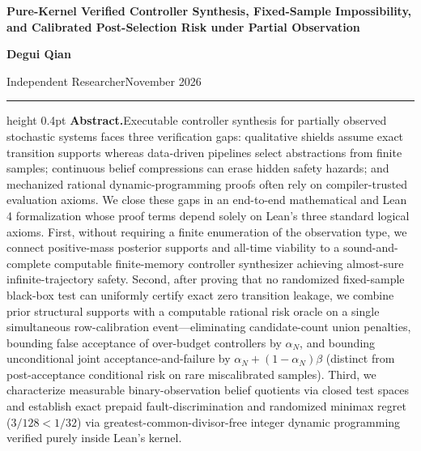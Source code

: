 \documentclass[11pt,a4paper]{article}
\begin{document}
\thispagestyle{plain}
\nolinenumbers
\begin{flushleft}
{\fontsize{17.5}{22}\selectfont\bfseries Pure-Kernel Verified Controller
Synthesis, Fixed-Sample Impossibility, and Calibrated Post-Selection
Risk under Partial Observation\par}
\vspace{9pt}
{\large\bfseries Degui Qian\par}
\vspace{3pt}
{\small Independent Researcher\quad\textperiodcentered\quad November
2026\par}
\end{flushleft}
\vspace{6pt}
\hrule height 0.4pt
\vspace{8pt}
\linenumbers
\noindent\textbf{Abstract.}\quad Executable controller synthesis for
partially observed stochastic systems faces three verification gaps:
qualitative shields assume exact transition supports whereas data-driven
pipelines select abstractions from finite samples; continuous belief
compressions can erase hidden safety hazards; and mechanized rational
dynamic-programming proofs often rely on compiler-trusted evaluation
axioms. We close these gaps in an end-to-end mathematical and Lean 4
formalization whose proof terms depend solely on Lean's three standard
logical axioms. First, without requiring a finite enumeration of the
observation type, we connect positive-mass posterior supports and
all-time viability to a sound-and-complete computable finite-memory
controller synthesizer achieving almost-sure infinite-trajectory safety.
Second, after proving that no randomized fixed-sample black-box test can
uniformly certify exact zero transition leakage, we combine prior
structural supports with a computable rational risk oracle on a single
simultaneous row-calibration event---eliminating candidate-count union
penalties, bounding false acceptance of over-budget controllers by
\(\alpha_N\), and bounding unconditional joint acceptance-and-failure by
\(\alpha_N + (1-\alpha_N)\beta\) (distinct from post-acceptance
conditional risk on rare miscalibrated samples). Third, we characterize
measurable binary-observation belief quotients via closed test spaces
and establish exact prepaid fault-discrimination and randomized minimax
regret (\(3/128 < 1/32\)) via greatest-common-divisor-free integer
dynamic programming verified purely inside Lean's kernel.\par
\vspace{6pt}
\par
\end{document}
